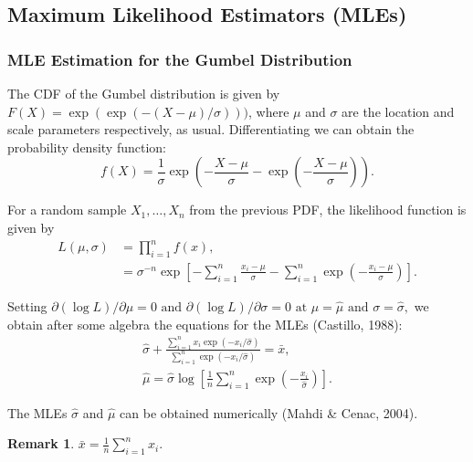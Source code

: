 \documentclass{article}
\newcommand\ddfrac[2]{\frac{\displaystyle #1}{\displaystyle #2}}
\newtheorem*{remark}{Remark}
\begin{document}

\newpage
\newpage

\subsection{Maximum Likelihood Estimators (MLEs)}


\subsubsection{MLE Estimation for the Gumbel Distribution}

The CDF of the Gumbel distribution is given by $F(X)=\exp(\exp(-(X-\mu)/\sigma)))$, where $\mu$ and $\sigma$ are the location and scale parameters respectively, as usual. Differentiating we can obtain the probability density function:
$$f(X) = \frac{1}{\sigma}\exp\left(-\frac{X-\mu}{\sigma}-\exp\left(-\frac{X-\mu}{\sigma}\right)\right).$$

For a random sample $X_1,\ldots,X_n$ from the previous PDF, the likelihood function is given by
\begin{align*}
    L(\mu,\sigma) &= \prod_{i=1}^{n}f(x),\\
                  &= \sigma^{-n}\exp\left[-\sum_{i=1}^{n}\frac{x_i - \mu}{\sigma}-\sum_{i=1}^{n}\exp\left(-\frac{x_i - \mu}{\sigma}\right)\right].
\end{align*}

Setting $\partial(\log L)/\partial\mu = 0 \text{ and } \partial (\log L)/\partial\sigma = 0 \text{ at } \mu = \hat{\mu} \text{ and } \sigma = \hat{\sigma},$ we obtain after some algebra the equations for the MLEs (Castillo, 1988):
\begin{align}
\hat{\sigma} + \ddfrac{\sum_{i=1}^{n}x_{i}\exp\left(-x_{i}/\hat{\sigma}\right)}{\sum_{i=1}^{n}\exp\left(-x_{i}/\hat{\sigma}\right)} = \bar{x},\label{MLEgumbel1}\\
\hat{\mu} = \hat{\sigma}\log\left[\frac{1}{n}\sum_{i=1}^{n}\exp\left(-\frac{x_{i}}{\hat{\sigma}}\right)\right].\label{MLEgumbel2}
\end{align}

The MLEs $\hat\sigma$ and $\hat\mu$ can be obtained numerically (Mahdi \& Cenac, 2004).

\begin{remark}
$\bar{x} = \frac{1}{n}\sum_{i=1}^{n}x_{i}.$
\end{remark}
\end{document}
